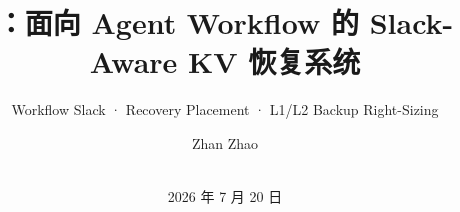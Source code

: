 \documentclass[aspectratio=169,10pt]{beamer}
\title{\AegisKV{}：面向 Agent Workflow 的 Slack-Aware KV 恢复系统}
\subtitle{Workflow Slack · Recovery Placement · L1/L2 Backup Right-Sizing}
\author[Zhao]{Zhan Zhao}
\institute[HKBU]{Hong Kong Baptist University}
\date[2026.07.20]{\meetingname\\2026 年 7 月 20 日}
\begin{document}
\begin{frame}[plain]
  \titlepage
\end{frame}










\end{document}
